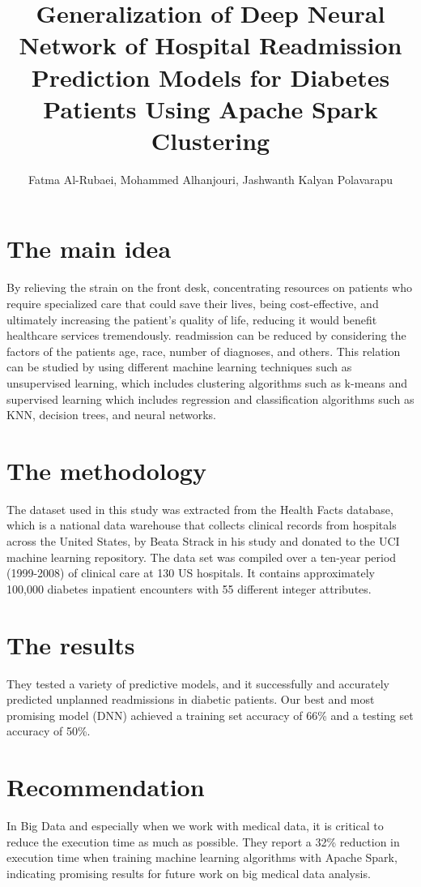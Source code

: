 \documentclass[a4paper]{article}
\title{Generalization of Deep Neural Network of Hospital Readmission Prediction Models for Diabetes Patients Using Apache Spark Clustering}
\author[1]{Fatma Al-Rubaei, Mohammed Alhanjouri, Jashwanth Kalyan Polavarapu}
\begin{document}
\maketitle
\section{The main idea}

By relieving the strain on the front desk, concentrating resources on patients who require specialized care that could save their lives, being cost-effective, and ultimately increasing the patient’s quality of life, reducing it would benefit healthcare services tremendously. readmission can be reduced by considering the factors of the  patients age, race, number of diagnoses, and others. This relation can be studied by using different machine learning techniques such as unsupervised learning, which includes clustering algorithms such as k-means and supervised learning which includes regression and classification algorithms such as KNN, decision trees, and neural networks. 

\section{The methodology }

The dataset used in this study was extracted from the Health Facts database, which is a national data warehouse that collects clinical records from hospitals across the United States, by Beata Strack in his study and donated to the UCI machine learning repository. The data set was compiled over a ten-year period (1999-2008) of clinical care at 130 US hospitals. It contains approximately 100,000 diabetes inpatient encounters with 55 different integer attributes.

\section{The results}
 
They tested a variety of predictive models, and it successfully and accurately predicted unplanned readmissions in diabetic patients. Our best and most promising model (DNN) achieved a training set accuracy of 66\% and a testing set accuracy of 50\%.

\section{Recommendation}

In Big Data and especially when we work with medical data, it is critical to reduce the execution time as much as possible. They report a 32\% reduction in execution time when training machine learning algorithms with Apache Spark, indicating promising results for future work on big medical data analysis.
\end{document}
